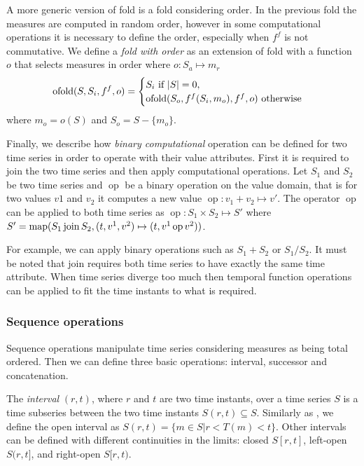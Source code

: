 A more generic version of fold is a fold considering order. In the
previous fold the measures are computed in random order, however in
some computational operations it is necessary to define the order,
especially when $f^f$ is not commutative. We define a \emph{fold with
  order} as an extension of fold with a function $o$ that selects
measures in order where $o: S_a \mapsto m_r$
\[
 \operatorname*{ofold}(S,S_i,f^f,o) =
  \begin{cases}
    S_i  \text{ if } |S|=0, \\
    \operatorname*{ofold}(S_o,f^f(S_i,m_o),f^f,o)  \text{ otherwise}
  \end{cases}
\]
 where $m_o = o(S)$ and $S_o = S - \{m_o\}$.


Finally, we describe how \emph{binary computational} operation can be defined
for two time series in order to operate with their value attributes.
First it is required to join the two time series and then apply
computational operations. Let $S_1$ and $S_2$ be two time series and
$\operatorname{op}$ be a binary operation on the value domain, that is
for two values $v1$ and $v_2$ it computes a new value
$\operatorname{op}: v_1 + v_2 \mapsto v'$. The operator
$\operatorname{op}$ can be applied to both time series as
$\operatorname{op}: S_1 \times S_2 \mapsto S'$ where $S' =
\operatorname*{map}(S_1 \operatorname*{join} S_2, (t,v^1,v^2)\mapsto(t,v^1 \operatorname{op} v^2))$.

For example, we can apply binary operations such as $S_1 + S_2$ or
$S_1 / S_2$. It must be noted that join requires both time series to
have exactly the same time attribute. When time series diverge too
much then temporal function operations can be applied to fit the time
instants to what is required.





\subsubsection{Sequence operations}

Sequence operations manipulate time series considering measures as
being total ordered. Then we can define three basic operations:
interval, successor and concatenation.


The \emph{interval} $(r,t)$, where $r$ and $t$ are two time instants, over a
time series $S$ is a time subseries between the two time instants
$S(r,t) \subseteq S$. Similarly as \cite{last:hetland}, we define the
open interval as $S(r,t)=\{m\in S | r<T(m)<t\}$. Other intervals can
be defined with different continuities in the limits: closed $S[r,t]$,
left-open $S(r,t]$, and right-open $S[r,t)$.

